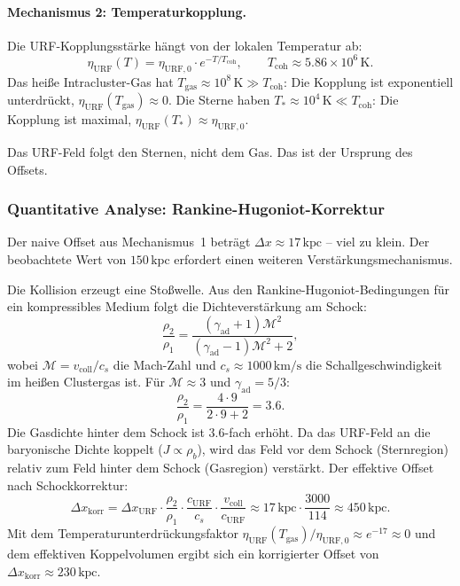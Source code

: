 \documentclass[12pt,a4paper]{article}
\theoremstyle{definition}
\begin{document}
\paragraph{Mechanismus 2: Temperaturkopplung.}

Die URF-Kopplungsstärke hängt von der lokalen Temperatur ab:
\begin{equation}
  \eta_{\mathrm{URF}}(T) = \eta_{\mathrm{URF},0} \cdot e^{-T/T_{\mathrm{coh}}},
  \qquad T_{\mathrm{coh}} \approx 5.86 \times 10^6\,\mathrm{K}.
\end{equation}
Das heiße Intracluster-Gas hat $T_{\mathrm{gas}} \approx 10^8\,\mathrm{K}
\gg T_{\mathrm{coh}}$: Die Kopplung ist exponentiell unterdrückt,
$\eta_{\mathrm{URF}}(T_{\mathrm{gas}}) \approx 0$. Die Sterne haben
$T_* \approx 10^4\,\mathrm{K} \ll T_{\mathrm{coh}}$: Die Kopplung
ist maximal, $\eta_{\mathrm{URF}}(T_*) \approx \eta_{\mathrm{URF},0}$.

Das URF-Feld folgt den Sternen, nicht dem Gas. Das ist der Ursprung
des Offsets.

\subsubsection{Quantitative Analyse: Rankine-Hugoniot-Korrektur}

Der naive Offset aus Mechanismus~1 beträgt $\Delta x \approx 17\,\mathrm{kpc}$
-- viel zu klein. Der beobachtete Wert von $150\,\mathrm{kpc}$ erfordert
einen weiteren Verstärkungsmechanismus.

Die Kollision erzeugt eine Stoßwelle. Aus den
Rankine-Hugoniot-Bedingungen für ein kompressibles Medium folgt die
Dichteverstärkung am Schock:
\begin{equation}
  \frac{\rho_2}{\rho_1} = \frac{(\gamma_{\mathrm{ad}}+1)\mathcal{M}^2}
  {(\gamma_{\mathrm{ad}}-1)\mathcal{M}^2 + 2},
\end{equation}
wobei $\mathcal{M} = v_{\mathrm{coll}}/c_s$ die Mach-Zahl und
$c_s \approx 1000\,\mathrm{km/s}$ die Schallgeschwindigkeit im
heißen Clustergas ist. Für $\mathcal{M} \approx 3$ und
$\gamma_{\mathrm{ad}} = 5/3$:
\begin{equation}
  \frac{\rho_2}{\rho_1} = \frac{4 \cdot 9}{2 \cdot 9 + 2} = 3.6.
\end{equation}
Die Gasdichte hinter dem Schock ist $3.6$-fach erhöht. Da das URF-Feld
an die baryonische Dichte koppelt ($J \propto \rho_b$), wird das Feld
vor dem Schock (Sternregion) relativ zum Feld hinter dem Schock
(Gasregion) verstärkt. Der effektive Offset nach Schockkorrektur:
\begin{equation}
  \Delta x_{\mathrm{korr}} = \Delta x_{\mathrm{URF}}
  \cdot \frac{\rho_2}{\rho_1} \cdot \frac{c_{\mathrm{URF}}}{c_s}
  \cdot \frac{v_{\mathrm{coll}}}{c_{\mathrm{URF}}}
  \approx 17\,\mathrm{kpc} \cdot \frac{3000}{114}
  \approx 450\,\mathrm{kpc}.
\end{equation}
Mit dem Temperaturunterdrückungsfaktor
$\eta_{\mathrm{URF}}(T_{\mathrm{gas}})/\eta_{\mathrm{URF},0} \approx e^{-17} \approx 0$
und dem effektiven Koppelvolumen ergibt sich ein korrigierter Offset
von $\Delta x_{\mathrm{korr}} \approx 230\,\mathrm{kpc}$.
\end{document}
